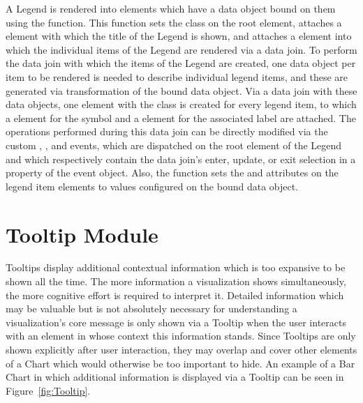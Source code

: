 A Legend is rendered into elements which have a  data
object bound on them using the  function. This
function sets the  class on the root element, attaches a
 element with which the title of the Legend is shown, and
attaches a  element into which the individual items of the
Legend are rendered via a data join. To perform the data join with
which the items of the Legend are created, one  data
object per item to be rendered is needed to describe individual legend
items, and these are generated via transformation of the bound
 data object. Via a data join with these data objects,
one  element with the  class is created
for every legend item, to which a  element for the symbol
and a  element for the associated label are attached.
The operations performed during this data join can be directly
modified via the custom , , and 
events, which are dispatched on the root element of the Legend and
which respectively contain the data join's enter, update, or exit
selection in a property of the event object. Also, the
 function sets the  and
 attributes on the legend item elements to values
configured on the bound  data object.






\section{Tooltip Module}
\label{sec:TooltipModule}

Tooltips display additional contextual information which is too
expansive to be shown all the time. The more information a
visualization shows simultaneously, the more cognitive effort is
required to interpret it. Detailed information which may be valuable
but is not absolutely necessary for understanding a visualization's
core message is only shown via a Tooltip when the user interacts with
an element in whose context this information stands. Since Tooltips
are only shown explicitly after user interaction, they may overlap and
cover other elements of a Chart which would otherwise be too important
to hide. An example of a Bar Chart in which additional information is
displayed via a Tooltip can be seen in Figure~\ref{fig:Tooltip}.


